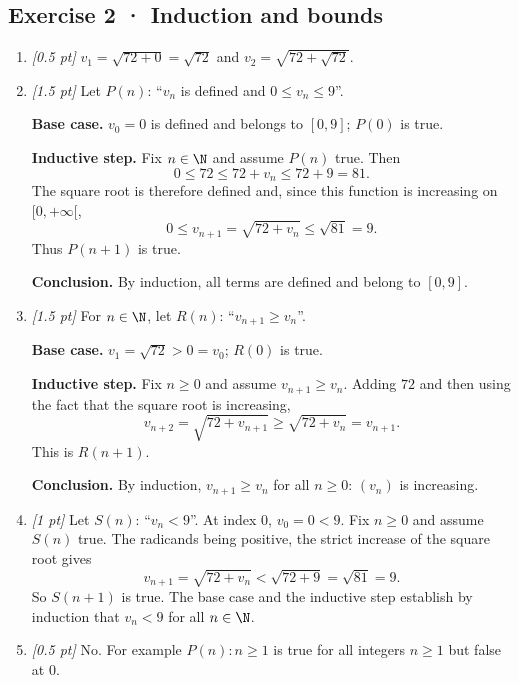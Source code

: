\subsection*{Exercise 2 · Induction and bounds}\begin{enumerate}

\item \textit{[0.5 pt]} $v_1=\sqrt{72+0}=\sqrt{72}$ and $v_2=\sqrt{72+\sqrt{72}}$.

\item \textit{[1.5 pt]} Let $P(n)$: ``$v_n$ is defined and $0\le v_n\le 9$''.
\par\smallskip\textbf{Base case.} $v_0=0$ is defined and belongs to $[0,9]$; $P(0)$ is true.
\par\smallskip\textbf{Inductive step.} Fix $n\in\N$ and assume $P(n)$ true. Then
\[0\le 72\le 72+v_n\le 72+9=81.\]
The square root is therefore defined and, since this function is increasing on $[0,+\infty[$,
\[0\le v_{n+1}=\sqrt{72+v_n}\le\sqrt{81}=9.\]
Thus $P(n+1)$ is true.
\par\smallskip\textbf{Conclusion.} By induction, all terms are defined and belong to $[0,9]$.

\item \textit{[1.5 pt]} For $n\in\N$, let $R(n)$: ``$v_{n+1}\ge v_n$''.
\par\smallskip\textbf{Base case.} $v_1=\sqrt{72}>0=v_0$; $R(0)$ is true.
\par\smallskip\textbf{Inductive step.} Fix $n\ge0$ and assume $v_{n+1}\ge v_n$. Adding $72$ and then using the fact that the square root is increasing,
\[v_{n+2}=\sqrt{72+v_{n+1}}\ge\sqrt{72+v_n}=v_{n+1}.\]
This is $R(n+1)$.
\par\smallskip\textbf{Conclusion.} By induction, $v_{n+1}\ge v_n$ for all $n\ge0$: $(v_n)$ is increasing.

\item \textit{[1 pt]} Let $S(n)$: ``$v_n<9$''. At index $0$, $v_0=0<9$.
Fix $n\ge0$ and assume $S(n)$ true. The radicands being positive, the strict increase of the square root gives
\[v_{n+1}=\sqrt{72+v_n}<\sqrt{72+9}=\sqrt{81}=9.\]
So $S(n+1)$ is true. The base case and the inductive step establish by induction that $v_n<9$ for all $n\in\N$.

\item \textit{[0.5 pt]} No. For example $P(n):n\ge1$ is true for all integers $n\ge1$ but false at $0$.

\end{enumerate}

